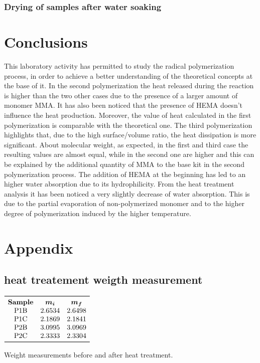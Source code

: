 \documentclass[a4paper, 11pt]{article}
\begin{document}
\subsubsection{Drying of samples after water soaking}


\section{Conclusions}

This laboratory activity has permitted to study the radical polymerization process, in order to achieve a better understanding of the theoretical concepts at the base of it.
In the second polymerization the heat released during the reaction is higher than the two other cases due to the presence of a larger amount of monomer MMA. It has also been noticed that the presence of HEMA doesn't influence the heat production. Moreover, the value of heat calculated in the first polymerization is comparable with the theoretical one. The third polymerization highlights that, due to the high surface/volume ratio, the heat dissipation is more significant. About molecular weight, as expected, in the first and third case the resulting values are almost equal, while in the second one are higher and this can be explained by the additional quantity of MMA to the base kit in the second polymerization process. The addition of HEMA at the beginning has led to an higher water absorption due to its hydrophilicity. From the heat treatment analysis it has been noticed a very slightly decrease of water absorption. This is due to the partial evaporation of non-polymerized monomer and to the higher degree of polymerization induced by the higher temperature.

\newpage

\section{Appendix}

\subsection{heat treatement weigth measurement}

\begin{table}[htp]
	\centering
	$
	\begin{array}{ccc}
	\toprule
	\textbf{Sample} & \bm{m_{i}} & \bm{m_{f}}\\
	\text{P1B} & 2.6534 & 2.6498 \\
	\text{P1C} & 2.1869 & 2.1841 \\
	\text{P2B} & 3.0995 & 3.0969 \\
	\text{P2C} & 2.3333 & 2.3304 \\
	\bottomrule
	\end{array}
	$
	\caption{Weight measurements before and after heat treatment.}
	\label{tab:weight}
\end{table}\\
\end{document}
